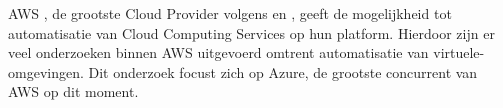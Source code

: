 \begin{comment}

Hier beschrijf je de \emph{state-of-the-art} rondom je gekozen onderzoeksdomein, d.w.z.\ een inleidende, doorlopende tekst over het onderzoeksdomein van je bachelorproef. Je steunt daarbij heel sterk op de professionele \emph{vakliteratuur}, en niet zozeer op populariserende teksten voor een breed publiek. Wat is de huidige stand van zaken in dit domein, en wat zijn nog eventuele open vragen (die misschien de aanleiding waren tot je onderzoeksvraag!)?

Je mag de titel van deze sectie ook aanpassen (literatuurstudie, stand van zaken, enz.). Zijn er al gelijkaardige onderzoeken gevoerd? Wat concluderen ze? Wat is het verschil met jouw onderzoek?

Verwijs bij elke introductie van een term of bewering over het domein naar de vakliteratuur, bijvoorbeeld~\autocite{Hykes2013}! Denk zeker goed na welke werken je refereert en waarom.

Draag zorg voor correcte literatuurverwijzingen! Een bronvermelding hoort thuis \emph{binnen} de zin waar je je op die bron baseert, dus niet er buiten! Maak meteen een verwijzing als je gebruik maakt van een bron. Doe dit dus \emph{niet} aan het einde van een lange paragraaf. Baseer nooit teveel aansluitende tekst op eenzelfde bron.

Als je informatie over bronnen verzamelt in JabRef, zorg er dan voor dat alle nodige info aanwezig is om de bron terug te vinden (zoals uitvoerig besproken in de lessen Research Methods).


Je mag deze sectie nog verder onderverdelen in subsecties als dit de structuur van de tekst kan verduidelijken.

\end{comment}

AWS \autocite{AWS2022}, de grootste Cloud Provider volgens \textcite{Vailshery2022} en \textcite{SRG2022}, geeft de mogelijkheid tot automatisatie van Cloud Computing Services op hun platform. Hierdoor zijn er veel onderzoeken binnen AWS uitgevoerd omtrent automatisatie van virtuele-omgevingen. Dit onderzoek focust zich op Azure, de grootste concurrent van AWS op dit moment.

